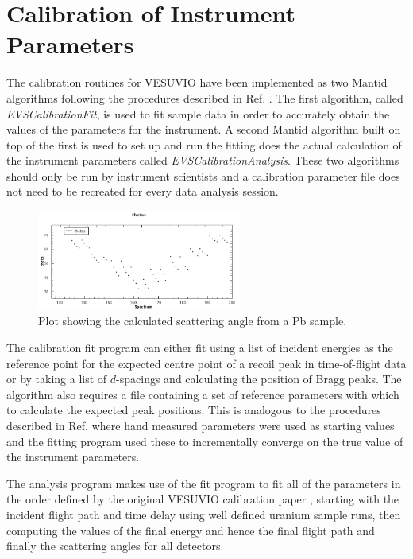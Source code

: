 \documentclass[paper=a4, fontsize=11pt]{scrartcl}	%
\numberwithin{equation}{section}															%
\numberwithin{figure}{section}																%
\numberwithin{table}{section}
\begin{document}
\section{Calibration of Instrument Parameters}
\label{sec:calibration}
The calibration routines for VESUVIO have been implemented as two Mantid algorithms following the procedures described in Ref. \cite{mayers2011calibration}. The first algorithm, called \textit{EVSCalibrationFit}, is used to fit sample data in order to accurately obtain the values of the parameters for the instrument. A second Mantid algorithm built on top of the first is used to set up and run the fitting does the actual calculation of the instrument parameters called \textit{EVSCalibrationAnalysis}. These two algorithms should only be run by instrument scientists and a calibration parameter file does not need to be recreated for every data analysis session.


\begin{figure}[H]
\centering
\includegraphics[width=0.6\textwidth]{img/calib-theta.png}
\caption{Plot showing the calculated scattering angle from a Pb sample.}
\label{fig:calib-theta}
\end{figure}

The calibration fit program can either fit using a list of incident energies as the reference point for the expected centre point of a recoil peak in time-of-flight data or by taking a list of $d$-spacings and calculating the position of Bragg peaks. The algorithm also requires a file containing a set of reference parameters with which to calculate the expected peak positions. This is analogous to the procedures described in Ref. \cite{mayers2011calibration} where hand measured parameters were used as starting values and the fitting program used these to incrementally converge on the true value of the instrument parameters.

The analysis program makes use of the fit program to fit all of the parameters in the order defined by the original VESUVIO calibration paper \cite{mayers2011calibration}, starting with the incident flight path and time delay using well defined uranium sample runs, then computing the values of the final energy and hence the final flight path and finally the scattering angles for all detectors.
\end{document}
